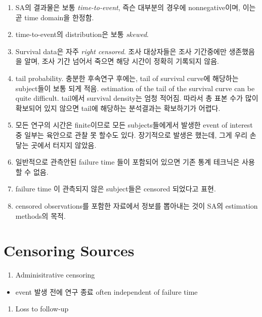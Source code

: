 \documentclass[
]{book}
\providecommand{\tightlist}{%
  \setlength{\itemsep}{0pt}\setlength{\parskip}{0pt}}
\theoremstyle{definition}
\theoremstyle{definition}
\theoremstyle{definition}
\theoremstyle{definition}
\theoremstyle{remark}
\begin{document}
\begin{enumerate}
\def\labelenumi{\arabic{enumi}.}
\item
  SA의 결과물은 보통 \emph{time-to-event}, 즉슨 대부분의 경우에 nonnegative이며, 이는 곧 time domain을 한정함.
\item
  time-to-event의 distribution은 보통 \emph{skewed}.
\item
  Survival data은 자주 \emph{right censored}. 조사 대상자들은 조사 기간중에만 생존했음을 알며, 조사 기간 넘어서 죽으면 해당 시간이 정확히 기록되지 않음.
\item
  tail probability. 충분한 후속연구 후에는, tail of survival curve에 해당하는 subject들이 보통 되게 적음. estimation of the tail of the survival curve can be quite difficult. tail에서 survival density는 엄청 적어짐. 따라서 총 표본 수가 많이 확보되어 있지 않으면 tail에 해당하는 분석결과는 확보하기가 어렵다.
\item
  모든 연구의 시간은 finite이므로 모든 subjects들에게서 발생한 event of interest 중 일부는 육안으로 관찰 못 할수도 있다. 장기적으로 발생은 했는데, 그게 우리 손닿는 곳에서 터지지 않았음.
\item
  일반적으로 관측안된 failure time 들이 포함되어 있으면 기존 통계 테크닉은 사용할 수 없음.
\item
  failure time 이 관측되지 않은 subject들은 censored 되었다고 표현.
\item
  censored observations를 포함한 자료에서 정보를 뽑아내는 것이 SA의 estimation methods의 목적.
\end{enumerate}

\hypertarget{censoring-sources}{%
\chapter{Censoring Sources}\label{censoring-sources}}

\begin{enumerate}
\def\labelenumi{\arabic{enumi}.}
\tightlist
\item
  Adminisitrative censoring
\end{enumerate}

\begin{itemize}
\tightlist
\item
  event 발생 전에 연구 종료
  often independent of failure time
\end{itemize}

\begin{enumerate}
\def\labelenumi{\arabic{enumi}.}
\setcounter{enumi}{1}
\tightlist
\item
  Loss to follow-up
\end{enumerate}
\end{document}
